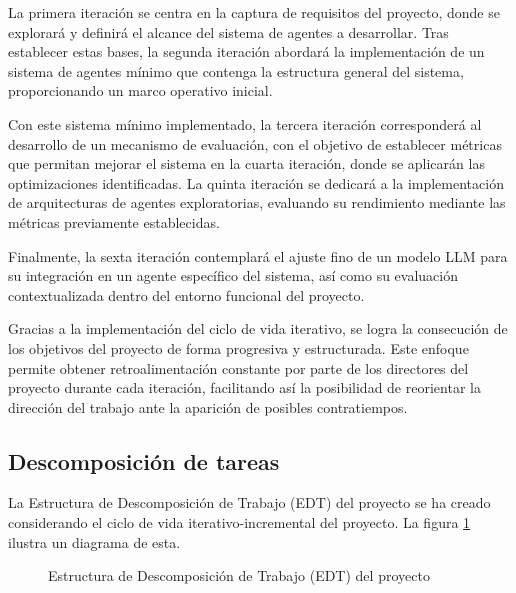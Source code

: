 La primera iteración se centra en la captura de requisitos del proyecto, donde se explorará y definirá el alcance del sistema de agentes a desarrollar. Tras establecer estas bases, la segunda iteración abordará la implementación de un sistema de agentes mínimo que contenga la estructura general del sistema, proporcionando un marco operativo inicial.

Con este sistema mínimo implementado, la tercera iteración corresponderá al desarrollo de un mecanismo de evaluación, con el objetivo de establecer métricas que permitan mejorar el sistema en la cuarta iteración, donde se aplicarán las optimizaciones identificadas. La quinta iteración se dedicará a la implementación de arquitecturas de agentes exploratorias, evaluando su rendimiento mediante las métricas previamente establecidas.

Finalmente, la sexta iteración contemplará el ajuste fino de un modelo LLM para su integración en un agente específico del sistema, así como su evaluación contextualizada dentro del entorno funcional del proyecto.

Gracias a la implementación del ciclo de vida iterativo, se logra la consecución de los objetivos del proyecto de forma progresiva y estructurada. Este enfoque permite obtener retroalimentación constante por parte de los directores del proyecto durante cada iteración, facilitando así la posibilidad de reorientar la dirección del trabajo ante la aparición de posibles contratiempos.

\subsection{Descomposición de tareas}
La Estructura de Descomposición de Trabajo (EDT) del proyecto se ha creado considerando el ciclo de vida iterativo-incremental del proyecto. La figura \ref{fig:edt} ilustra un diagrama de esta. 

\begin{figure}[h]
  \centering
  \caption{Estructura de Descomposición de Trabajo (EDT) del proyecto}
  \label{fig:edt}
\end{figure}


